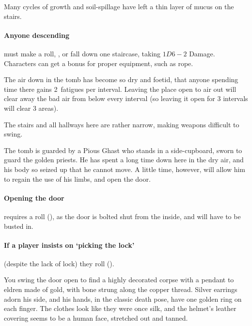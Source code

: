 \begin{multicols}{2}
Many \glspl{cycle} of growth and soil-spillage have left a thin layer of mucus on the stairs.

\paragraph{Anyone descending}
must make a  roll, \tn[8], or fall down one staircase, taking $1D6-2$ Damage.
Characters can get a bonus for proper equipment, such as rope.

The air down in the tomb has become so dry and foetid, that anyone spending time there gains 2~\glspl{fatigue} per \gls{interval}.
Leaving the place open to air out will clear away the bad air from  below every \gls{interval} (so leaving it open for 3 \glspl{interval} will clear 3 \glspl{area}).

The stairs and all hallways here are rather narrow, making weapons difficult to swing.%


The tomb is guarded by a Pious Ghast who stands in a side-cupboard, sworn to guard the golden priests.
He has spent a long time down here in the dry air, and his body so seized up that he cannot move.
A little time, however, will allow him to regain the use of his limbs, and open the door.

\paragraph{Opening the door}
requires a  roll (\tn[14]), as the door is bolted shut from the inside, and will have to be busted in.

\paragraph{If a player insists on `picking the lock'}
(despite the lack of lock) they roll  (\tn[16]).

\begin{boxtext}
  You swing the door open to find a highly decorated corpse with a pendant to \gls{eldren} made of gold, with bone strung along the copper thread.
  Silver earrings adorn his side, and his hands, in the classic death pose, have one golden ring on each finger.
  The clothes look like they were once silk, and the helmet's leather covering seems to be a human face, stretched out and tanned.
\end{boxtext}


\end{multicols}
